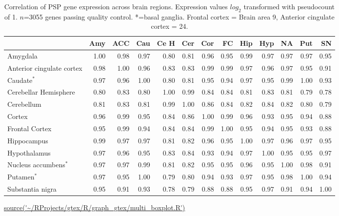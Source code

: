 \begin{table}[ht]
\centering
    \setlength{\extrarowheight}{2pt}
\begin{adjustbox}{width=\textwidth}

\begin{tabular}{lrrrrrrrrrrrr}
  \toprule
 &   Amy &   ACC &   Cau &   Ce H &   Cer &   Cor &   FC  &   Hip &   Hyp &   NA &   Put &  SN \\ 
  \midrule
  Amygdala & 1.00 & 0.98 & 0.97 & 0.80 & 0.81 & 0.96 & 0.95 & 0.99 & 0.97 & 0.97 & 0.97 & 0.95 \\ 
    Anterior cingulate cortex  & 0.98 & 1.00 & 0.96 & 0.83 & 0.83 & 0.99 & 0.99 & 0.97 & 0.96 & 0.97 & 0.95 & 0.91 \\ 
    Caudate$^*$ & 0.97 & 0.96 & 1.00 & 0.80 & 0.81 & 0.95 & 0.94 & 0.97 & 0.95 & 0.99 & 1.00 & 0.93 \\ 
    Cerebellar Hemisphere & 0.80 & 0.83 & 0.80 & 1.00 & 0.99 & 0.84 & 0.84 & 0.81 & 0.83 & 0.81 & 0.79 & 0.78 \\ 
    Cerebellum & 0.81 & 0.83 & 0.81 & 0.99 & 1.00 & 0.86 & 0.84 & 0.82 & 0.84 & 0.82 & 0.80 & 0.79 \\ 
    Cortex & 0.96 & 0.99 & 0.95 & 0.84 & 0.86 & 1.00 & 0.99 & 0.96 & 0.93 & 0.95 & 0.94 & 0.88 \\ 
    Frontal Cortex  & 0.95 & 0.99 & 0.94 & 0.84 & 0.84 & 0.99 & 1.00 & 0.95 & 0.94 & 0.95 & 0.93 & 0.88 \\ 
    Hippocampus & 0.99 & 0.97 & 0.97 & 0.81 & 0.82 & 0.96 & 0.95 & 1.00 & 0.97 & 0.96 & 0.97 & 0.95 \\ 
    Hypothalamus & 0.97 & 0.96 & 0.95 & 0.83 & 0.84 & 0.93 & 0.94 & 0.97 & 1.00 & 0.95 & 0.95 & 0.97 \\ 
    Nucleus accumbens$^*$ & 0.97 & 0.97 & 0.99 & 0.81 & 0.82 & 0.95 & 0.95 & 0.96 & 0.95 & 1.00 & 0.98 & 0.91 \\ 
    Putamen$^*$  & 0.97 & 0.95 & 1.00 & 0.79 & 0.80 & 0.94 & 0.93 & 0.97 & 0.95 & 0.98 & 1.00 & 0.94 \\ 
     Substantia nigra & 0.95 & 0.91 & 0.93 & 0.78 & 0.79 & 0.88 & 0.88 & 0.95 & 0.97 & 0.91 & 0.94 & 1.00 \\ 
   \bottomrule
\end{tabular}
\end{adjustbox}
\caption[Correlation of PSP gene expression across brain regions]{Correlation of PSP gene expression across brain regions. Expression values $log_2$ transformed with pseudocount of 1. $n$=3055 genes passing quality control. *=basal ganglia. Frontal cortex = Brain area 9, Anterior cingulate cortex = 24.}
\tiny\url{source('~/RProjects/gtex/R/graph_gtex/multi_boxplot.R')}
\label{tab:Correlation of PSP gene expression across brain regions. Expression values $log_2$ transformed with pseudocount of 1}
\end{table}





